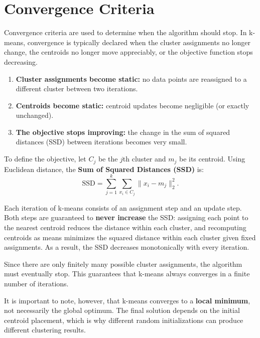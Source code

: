 \documentclass{article}
\begin{document}
\section{Convergence Criteria}

Convergence criteria are used to determine when the algorithm should stop.
In k-means, convergence is typically declared when the cluster assignments no
longer change, the centroids no longer move appreciably, or the objective
function stops decreasing.

\begin{enumerate}
    \item \textbf{Cluster assignments become static:}
    no data points are reassigned to a different cluster between two iterations.

    \item \textbf{Centroids become static:}
    centroid updates become negligible (or exactly unchanged).

    \item \textbf{The objective stops improving:}
    the change in the sum of squared distances (SSD) between iterations becomes
    very small.
\end{enumerate}

To define the objective, let $C_j$ be the $j$th cluster and $m_j$ be its centroid.
Using Euclidean distance, the \textbf{Sum of Squared Distances (SSD)} is:
\begin{equation}
    \mathrm{SSD} = \sum_{j=1}^k \sum_{x_i \in C_j} \|x_i - m_j\|_2^2.
\end{equation}

Each iteration of k-means consists of an assignment step and an update step.
Both steps are guaranteed to \textbf{never increase} the SSD:
assigning each point to the nearest centroid reduces the distance within each
cluster, and recomputing centroids as means minimizes the squared distance within
each cluster given fixed assignments. As a result, the SSD decreases monotonically
with every iteration.

Since there are only finitely many possible cluster assignments, the algorithm
must eventually stop. This guarantees that k-means always converges in a finite
number of iterations.

It is important to note, however, that k-means converges to a
\textbf{local minimum}, not necessarily the global optimum. The final solution
depends on the initial centroid placement, which is why different random
initializations can produce different clustering results.
\end{document}
